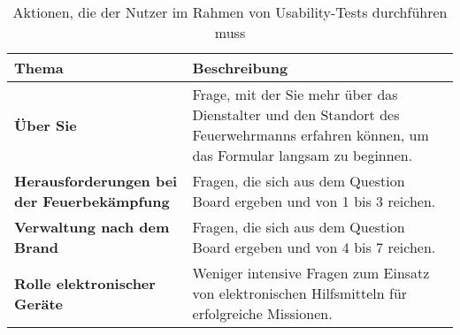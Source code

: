 \begin{table}[H]
  \begin{tabular}{p{0.4\linewidth} |p{0.6\linewidth}}
    Thema                                              & Beschreibung                                                                                                                           \\ \hline\hline

    \textbf{Über Sie}                                  & Frage, mit der Sie mehr über das Dienstalter und den Standort des Feuerwehrmanns erfahren können, um das Formular langsam zu beginnen. \\\hline
    \textbf{Herausforderungen bei der Feuerbekämpfung} & Fragen, die sich aus dem Question Board ergeben und von 1 bis 3 reichen.                                                               \\\hline
    \textbf{Verwaltung nach dem Brand}                 & Fragen, die sich aus dem Question Board ergeben und von 4 bis 7 reichen.                                                               \\\hline
    \textbf{Rolle elektronischer Geräte}               & Weniger intensive Fragen zum Einsatz von elektronischen Hilfsmitteln für erfolgreiche Missionen.
    \\\hline
  \end{tabular}
  \caption{Aktionen, die der Nutzer im Rahmen von Usability-Tests durchführen muss}
\end{table}
